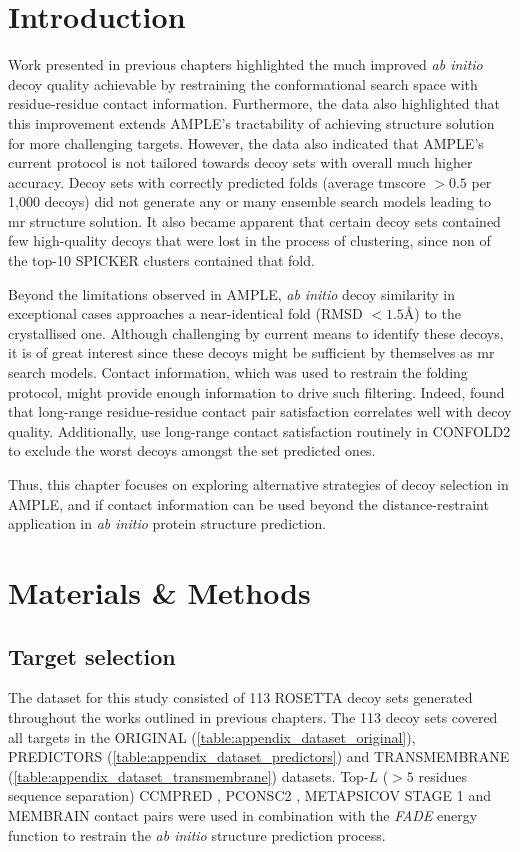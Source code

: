 \section{Introduction}
Work presented in previous chapters highlighted the much improved \textit{ab initio} decoy quality achievable by restraining the conformational search space with residue-residue contact information. Furthermore, the data also highlighted that this improvement extends AMPLE's tractability of achieving structure solution for more challenging targets. However, the data also indicated that AMPLE's current protocol is not tailored towards decoy sets with overall much higher accuracy. Decoy sets with correctly predicted folds (average \gls{tmscore} $>0.5$ per 1,000 decoys) did not generate any or many ensemble search models leading to \gls{mr} structure solution. It also became apparent that certain decoy sets contained few high-quality decoys that were lost in the process of clustering, since non of the top-10 SPICKER clusters contained that fold.

Beyond the limitations observed in AMPLE, \textit{ab initio} decoy similarity in exceptional cases approaches a near-identical fold (RMSD $<1.5$\AA) to the crystallised one. Although challenging by current means to identify these decoys, it is of great interest since these decoys might be sufficient by themselves as \gls{mr} search models. Contact information, which was used to restrain the folding protocol, might provide enough information to drive such filtering. Indeed, \textcite{De_Oliveira2017-gj} found that long-range residue-residue contact pair satisfaction correlates well with decoy quality. Additionally, \textcite{Adhikari2018-lj} use long-range contact satisfaction routinely in CONFOLD2 to exclude the worst decoys amongst the set predicted ones.

Thus, this chapter focuses on exploring alternative strategies of decoy selection in AMPLE, and if contact information can be used beyond the distance-restraint application in \textit{ab initio} protein structure prediction.

\section{Materials \& Methods}
\subsection{Target selection}
The dataset for this study consisted of 113 ROSETTA decoy sets generated throughout the works outlined in previous chapters. The 113 decoy sets covered all targets in the ORIGINAL (\cref{table:appendix_dataset_original}), PREDICTORS (\cref{table:appendix_dataset_predictors}) and TRANSMEMBRANE (\cref{table:appendix_dataset_transmembrane}) datasets. Top-$L$ ($>5$ residues sequence separation) CCMPRED \cite{Seemayer2014-zp}, PCONSC2 \cite{Skwark2014-qp}, METAPSICOV STAGE 1 \cite{Jones2015-vq} and MEMBRAIN \cite{Yang2013-bf} contact pairs were used in combination with the \textit{FADE} energy function to restrain the \textit{ab initio} structure prediction process.

